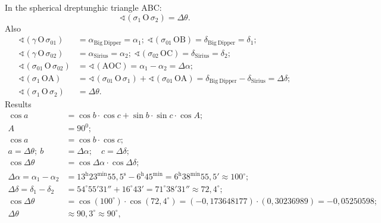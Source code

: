 \begin{description}
  In the spherical dreptunghic triangle ABC: %
  \[ \sphericalangle\left(\sigma_1\,\mathrm{O}\,\sigma_2\right)
     = \Delta\theta. \]
  Also
  \begin{align*}
  \sphericalangle\left(\gamma\,\mathrm{O}\,\sigma_{01}\right)
    &= \alpha_{\mathrm{Big\ Dipper}} = \alpha_1;\
  \sphericalangle\left(\sigma_{01}\,\mathrm{OB}\right)
    = \delta_{\mathrm{Big\ Dipper}} = \delta_1;\\
  \sphericalangle\left(\gamma\,\mathrm{O}\,\sigma_{02}\right)
    &= \alpha_{\mathrm{Sirius}} = \alpha_2;\
  \sphericalangle\left(\sigma_{02}\,\mathrm{OC}\right)
    = \delta_{\mathrm{Sirius}} = \delta_2;\\
  \sphericalangle\left(\sigma_{01}\,\mathrm{O}\,\sigma_{02}\right)
    &= \sphericalangle\left(\mathrm{AOC}\right)
    = \alpha_1 - \alpha_2 = \Delta\alpha;\\
  \sphericalangle\left(\sigma_1\,\mathrm{OA}\right)
    &= \sphericalangle\left(\sigma_{01}\,\mathrm{O}\,\sigma_1\right)
     + \sphericalangle\left(\sigma_{01}\,\mathrm{OA}\right)
    = \delta_{\mathrm{Big\ Dipper}} - \delta_{\mathrm{Sirius}}
    = \Delta\delta;\\
  \sphericalangle\left(\sigma_1\,\mathrm{O}\,\sigma_2\right)
    &= \Delta\theta.
  \end{align*}
  Results
  \begin{align*}
  \cos a &= \cos b\cdot\cos c + \sin b\cdot\sin c\cdot\cos A;\\
  A &= 90^{0};\\
  \cos a &= \cos b\cdot\cos c;\\
  a = \Delta\theta;\ b &= \Delta\alpha;\quad c = \Delta\delta;\\
  \cos\Delta\theta &= \cos\Delta\alpha\cdot\cos\Delta\delta;\\
  \Delta\alpha = \alpha_1 - \alpha_2
    &= 13^{\mathrm{h}}23^{\mathrm{min}}55{,}5^{\mathrm{s}}
     - 6^{\mathrm{h}}45^{\mathrm{min}}
     = 6^{\mathrm{h}}38^{\mathrm{min}}55{,}5' \approx 100^\circ;
  \\
  \Delta\delta = \delta_1 - \delta_2
    &= 54^\circ55'31'' + 16^\circ43' = 71^\circ38'31''
    \approx 72{,}4^\circ;\\
  \cos\Delta\theta &= \cos\left(100^\circ\right)
    \cdot\cos\left(72{,}4^\circ\right)
    = \left(-0{,}173648177\right)\cdot\left(0{,}30236989\right)
    = -0{,}05250598;\\
  \Delta\theta &\approx 90{,}3^\circ \approx 90^\circ,

\end{align*}
\end{description}
